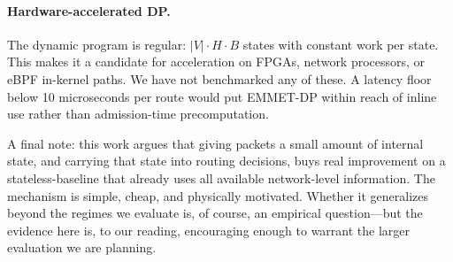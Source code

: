 \paragraph{Hardware-accelerated DP.}
The dynamic program is regular: $|V| \cdot H \cdot B$ states with
constant work per state. This makes it a candidate for
acceleration on FPGAs, network processors, or eBPF in-kernel
paths. We have not benchmarked any of these. A latency floor
below 10 microseconds per route would put EMMET-DP within reach
of inline use rather than admission-time precomputation.

A final note: this work argues that giving packets a small amount
of internal state, and carrying that state into routing decisions,
buys real improvement on a stateless-baseline that already uses
all available network-level information. The mechanism is simple,
cheap, and physically motivated. Whether it generalizes beyond
the regimes we evaluate is, of course, an empirical question—but
the evidence here is, to our reading, encouraging enough to
warrant the larger evaluation we are planning.
